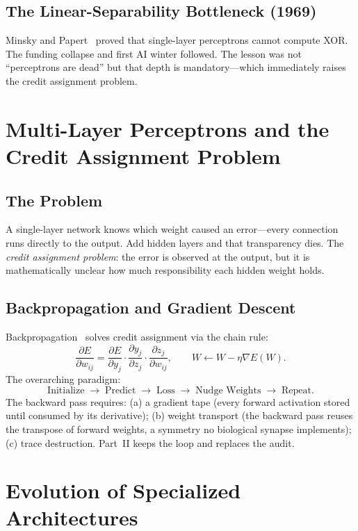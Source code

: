 \documentclass[11pt,letterpaper]{article}
\begin{document}
\subsection{The Linear-Separability Bottleneck (1969)}

Minsky and Papert~\cite{minsky1969} proved that single-layer perceptrons cannot
compute XOR.  The funding collapse and first AI winter followed.  The lesson
was not ``perceptrons are dead'' but that depth is mandatory---which immediately
raises the credit assignment problem.

\section{Multi-Layer Perceptrons and the Credit Assignment Problem}

\subsection{The Problem}

A single-layer network knows which weight caused an error---every connection
runs directly to the output.  Add hidden layers and that transparency dies.
The \textit{credit assignment problem}: the error is observed at the output,
but it is mathematically unclear how much responsibility each hidden weight
holds.

\subsection{Backpropagation and Gradient Descent}

Backpropagation~\cite{rumelhart1986} solves credit assignment via the chain rule:
\[
\frac{\partial E}{\partial w_{ij}} = \frac{\partial E}{\partial y_j} \cdot
\frac{\partial y_j}{\partial z_j} \cdot \frac{\partial z_j}{\partial w_{ij}},
\qquad W \leftarrow W - \eta \nabla E(W).
\]
The overarching paradigm:
\[
\text{Initialize} \;\longrightarrow\; \text{Predict} \;\longrightarrow\;
\text{Loss} \;\longrightarrow\; \text{Nudge Weights} \;\longrightarrow\;
\text{Repeat.}
\]
The backward pass requires: (a) a gradient tape (every forward activation
stored until consumed by its derivative); (b) weight transport (the backward
pass reuses the transpose of forward weights, a symmetry no biological synapse
implements); (c) trace destruction.  Part~II keeps the loop and replaces the
audit.

\section{Evolution of Specialized Architectures}
\end{document}
